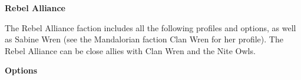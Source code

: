 \documentclass{article}
\begin{document}
{\Huge \textbf{Rebel Alliance}}
\vspace{0.6cm}

\begin{minipage}{19cm}
    The Rebel Alliance faction includes all the following profiles and options,
    as well as Sabine Wren (see the Mandalorian faction Clan Wren for her profile).
    The Rebel Alliance can be close allies with Clan Wren and the Nite Owls.
\end{minipage}

\vspace{0.3cm}
{\scriptsize

\setlength\extrarowheight{1.5pt}


}
\vspace{0.6cm}

{\Large \textbf{Options}}
\begin{multicols}{2}

{\scriptsize

\setlength\extrarowheight{1.5pt}


\vspace{0.6cm}

\setlength\extrarowheight{1.5pt}


\vspace{0.6cm}

\setlength\extrarowheight{1.5pt}


\vspace{0.6cm}

\setlength\extrarowheight{1.5pt}


}
\end{multicols}
\end{document}
